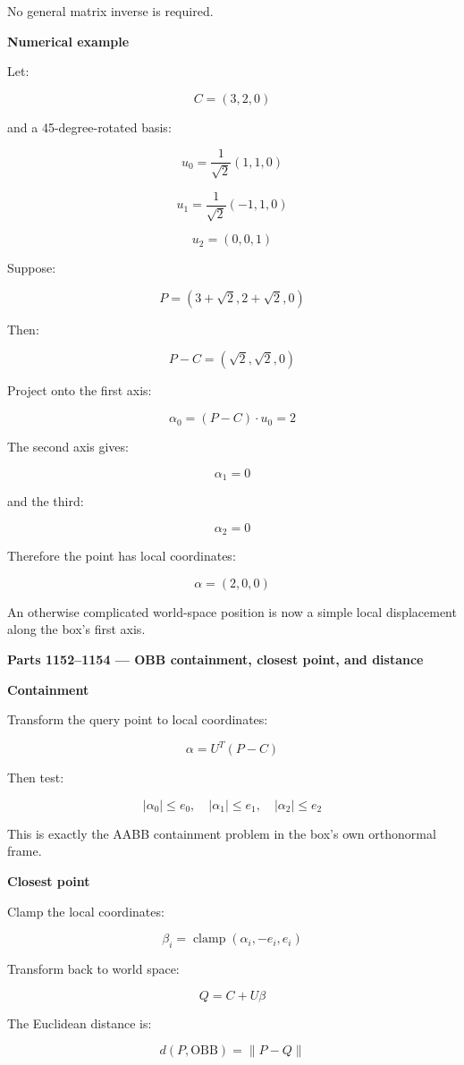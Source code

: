 No general matrix inverse is required.

\textbf{Numerical example}

Let:

\[
C=(3,2,0)
\]

and a 45-degree-rotated basis:

\[
u_0=\frac{1}{\sqrt2}(1,1,0)
\]

\[
u_1=\frac{1}{\sqrt2}(-1,1,0)
\]

\[
u_2=(0,0,1)
\]

Suppose:

\[
P=(3+\sqrt2,2+\sqrt2,0)
\]

Then:

\[
P-C=(\sqrt2,\sqrt2,0)
\]

Project onto the first axis:

\[
\alpha_0=(P-C)\cdot u_0=2
\]

The second axis gives:

\[
\alpha_1=0
\]

and the third:

\[
\alpha_2=0
\]

Therefore the point has local coordinates:

\[
\boxed{\alpha=(2,0,0)}
\]

An otherwise complicated world-space position is now a simple local displacement along the box's first axis.

\textbf{Parts 1152--1154 --- OBB containment, closest point, and distance}

\textbf{Containment}

Transform the query point to local coordinates:

\[
\alpha=U^T(P-C)
\]

Then test:

\[
\boxed{ |\alpha_0|\le e_0,\quad |\alpha_1|\le e_1,\quad |\alpha_2|\le e_2 }
\]

This is exactly the AABB containment problem in the box's own orthonormal frame.

\textbf{Closest point}

Clamp the local coordinates:

\[
\beta_i=\operatorname{clamp}(\alpha_i,-e_i,e_i)
\]

Transform back to world space:

\[
\boxed{ Q=C+U\beta }
\]

The Euclidean distance is:

\[
\boxed{ d(P,\mathrm{OBB})=\|P-Q\| }
\]

